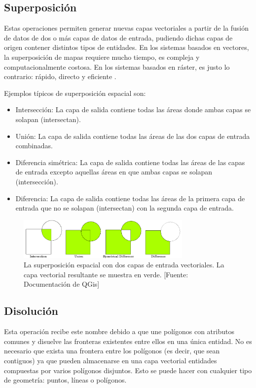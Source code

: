 \subsection{Superposición}

Estas operaciones permiten generar nuevas capas vectoriales a partir de la fusión de datos de dos o más capas de datos de entrada, pudiendo dichas capas de origen contener distintos tipos de entidades. En los sistemas basados en vectores, la superposición de mapas requiere mucho tiempo, es compleja y computacionalmente costosa. En los sistemas basados en ráster, es justo lo contrario: rápido, directo y eficiente \citep{Heywood2006AnSystems}.

Ejemplos típicos de superposición espacial son:

\begin{itemize}
    \item Intersección: La capa de salida contiene todas las áreas donde ambas capas se solapan (intersectan).
    \item Unión: La capa de salida contiene todas las áreas de las dos capas de entrada combinadas.
    \item Diferencia simétrica: La capa de salida contiene todas las áreas de las capas de entrada excepto aquellas áreas en que ambas capas se solapan (intersección).
    \item Diferencia: La capa de salida contiene todas las áreas de la primera capa de entrada que no se solapan (intersectan) con la segunda capa de entrada.
\end{itemize} 

\begin{figure}[H]
    \centering
    \includegraphics[width=8.5cm]{overlay_operations.png}
    \caption{La superposición espacial con dos capas de entrada vectoriales. La capa vectorial resultante se muestra en verde. [Fuente: Documentación de QGis]}
    \label{fig:overlay}
\end{figure}

\subsection{Disolución}

Esta operación recibe este nombre debido a que une polígonos con atributos comunes y disuelve las fronteras existentes entre ellos en una única entidad. No es necesario que exista una frontera entre los polígonos (es decir, que sean contiguos) ya que pueden almacenarse en una capa vectorial entidades compuestas por varios polígonos disjuntos. Esto se puede hacer con cualquier tipo de geometría: puntos, líneas o polígonos.

